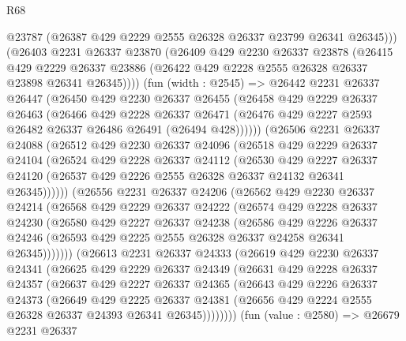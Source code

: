 \begin{lexlean}{R68}
\begin{coremodule}
        @23787
        (@26387 @429 @2229 @2555 @26328 @26337 @23799 @26341 @26345)))
    (@26403
      @2231
      @26337
      @23870
      (@26409
        @429
        @2230
        @26337
        @23878
        (@26415
          @429
          @2229
          @26337
          @23886
          (@26422 @429 @2228 @2555 @26328 @26337 @23898 @26341 @26345))))
    (fun (width : @2545) =>
    @26442
      @2231
      @26337
      @26447
      (@26450
        @429
        @2230
        @26337
        @26455
        (@26458
          @429
          @2229
          @26337
          @26463
          (@26466
            @429
            @2228
            @26337
            @26471
            (@26476 @429 @2227 @2593 @26482 @26337 @26486 @26491 (@26494 @428))))))
    (@26506
      @2231
      @26337
      @24088
      (@26512
        @429
        @2230
        @26337
        @24096
        (@26518
          @429
          @2229
          @26337
          @24104
          (@26524
            @429
            @2228
            @26337
            @24112
            (@26530
              @429
              @2227
              @26337
              @24120
              (@26537 @429 @2226 @2555 @26328 @26337 @24132 @26341 @26345))))))
    (@26556
      @2231
      @26337
      @24206
      (@26562
        @429
        @2230
        @26337
        @24214
        (@26568
          @429
          @2229
          @26337
          @24222
          (@26574
            @429
            @2228
            @26337
            @24230
            (@26580
              @429
              @2227
              @26337
              @24238
              (@26586
                @429
                @2226
                @26337
                @24246
                (@26593 @429 @2225 @2555 @26328 @26337 @24258 @26341 @26345)))))))
    (@26613
      @2231
      @26337
      @24333
      (@26619
        @429
        @2230
        @26337
        @24341
        (@26625
          @429
          @2229
          @26337
          @24349
          (@26631
            @429
            @2228
            @26337
            @24357
            (@26637
              @429
              @2227
              @26337
              @24365
              (@26643
                @429
                @2226
                @26337
                @24373
                (@26649
                  @429
                  @2225
                  @26337
                  @24381
                  (@26656 @429 @2224 @2555 @26328 @26337 @24393 @26341 @26345))))))))
    (fun (value : @2580) =>
    @26679
      @2231
      @26337

\end{coremodule}
\end{lexlean}
